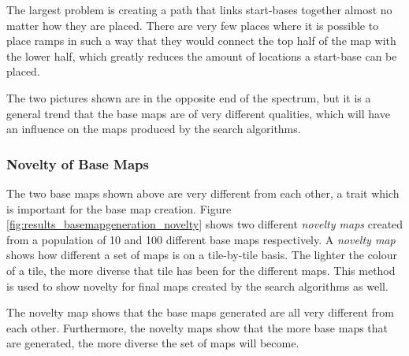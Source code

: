 The largest problem is creating a path that links start-bases together almost no matter how they are placed. There are very few places where it is possible to place ramps in such a way that they would connect the top half of the map with the lower half, which greatly reduces the amount of locations a start-base can be placed.

The two pictures shown are in the opposite end of the spectrum, but it is a general trend that the base maps are of very different qualities, which will have an influence on the maps produced by the search algorithms.

\subsubsection{Novelty of Base Maps}

The two base maps shown above are very different from each other, a trait which is important for the base map creation. Figure \ref{fig:results_basemapgeneration_novelty} shows two different \textit{novelty maps} created from a population of 10 and 100 different base maps respectively. A \textit{novelty map} shows how different a set of maps is on a tile-by-tile basis. The lighter the colour of a tile, the more diverse that tile has been for the different maps. This method is used to show novelty for final maps created by the search algorithms as well.


The novelty map shows that the base maps generated are all very different from each other. Furthermore, the novelty maps show that the more base maps that are generated, the more diverse the set of maps will become.